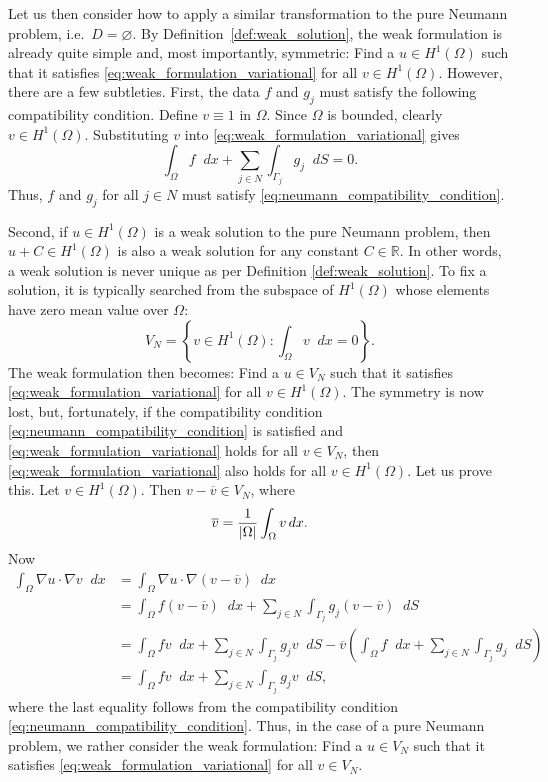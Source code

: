 \documentclass[english, 12pt, a4paper, sci, utf8, a-2b, online]{aaltothesis}
\theoremstyle{definition}
\theoremstyle{plain}
\DeclarePairedDelimiter\abs{\lvert}{\rvert}
\newcommand*\diff{\mathop{}\!d}
\numberwithin{equation}{section}
\begin{document}
Let us then consider how to apply a similar transformation to
the pure Neumann problem, i.e.\ $D = \varnothing$.
By Definition~\ref{def:weak_solution}, the weak formulation is already quite simple
and, most importantly, symmetric:
Find a $u \in H^1(\Omega)$ such that it satisfies 
\eqref{eq:weak_formulation_variational} for all $v \in H^1(\Omega)$.
However, there are a few subtleties.
First, the data $f$ and $g_j$ must satisfy the following compatibility condition.
Define $v \equiv 1$ in $\Omega$. Since $\Omega$ is bounded, clearly
$v \in H^1(\Omega)$. Substituting $v$ into \eqref{eq:weak_formulation_variational}
gives
\begin{equation}
    \label{eq:neumann_compatibility_condition}
    \int_{\Omega} f \diff x + \sum_{j \in N} \int_{\Gamma_j} g_j \diff S = 0.
\end{equation}
Thus, $f$ and $g_j$ for all $j \in N$
must satisfy \eqref{eq:neumann_compatibility_condition}.

Second, if $u \in H^1(\Omega)$ is a weak solution to the pure Neumann problem,
then $u + C \in H^1(\Omega)$ is also a weak solution for any constant
$C \in \mathbb{R}$.
In other words, a weak solution is never unique as per Definition
\ref{def:weak_solution}. To fix a solution,
it is typically searched from the subspace of $H^1(\Omega)$ whose elements have zero mean value
over $\Omega$:
\begin{equation*}
    V_N = \left\{ v \in H^1(\Omega) : \int_{\Omega} v \diff x = 0 \right\}.
\end{equation*}
The weak formulation then becomes: Find a $u \in V_N$ such that it satisfies
\eqref{eq:weak_formulation_variational} for all $v \in H^1(\Omega)$.
The symmetry is now lost, but, fortunately, if the compatibility condition 
\eqref{eq:neumann_compatibility_condition} is
satisfied and \eqref{eq:weak_formulation_variational} holds for all
$v \in V_N$, then \eqref{eq:weak_formulation_variational} also holds for all $v \in H^1(\Omega)$.
Let us prove this. Let $v \in H^1(\Omega)$. Then $v - \overline{v} \in V_N$, where
\begin{align*}
    \overline{v} = \frac{1}{\abs{\Omega}} \int_{\Omega} v \diff x.
\end{align*}
Now
\begin{align*}
    \int_{\Omega} \nabla u \cdot \nabla v \diff x
    &= \int_{\Omega} \nabla u \cdot \nabla (v - \overline{v}) \diff x \\
    &= \int_{\Omega} f (v - \overline{v}) \diff x
        + \sum_{j \in N} \int_{\Gamma_j} g_j (v - \overline{v}) \diff S \\
    &= \int_{\Omega} f v \diff x + \sum_{j \in N} \int_{\Gamma_j} g_j v \diff S
        - \overline{v} \left( \int_{\Omega} f \diff x
            + \sum_{j \in N} \int_{\Gamma_j} g_j \diff S \right) \\
    &= \int_{\Omega} f v \diff x + \sum_{j \in N} \int_{\Gamma_j} g_j v \diff S,
\end{align*}
where the last equality follows from the compatibility condition
\eqref{eq:neumann_compatibility_condition}.
Thus, in the case of a pure Neumann problem,
we rather consider the weak formulation:
Find a $u \in V_N$ such that it satisfies \eqref{eq:weak_formulation_variational}
for all $v \in V_N$.
\end{document}
